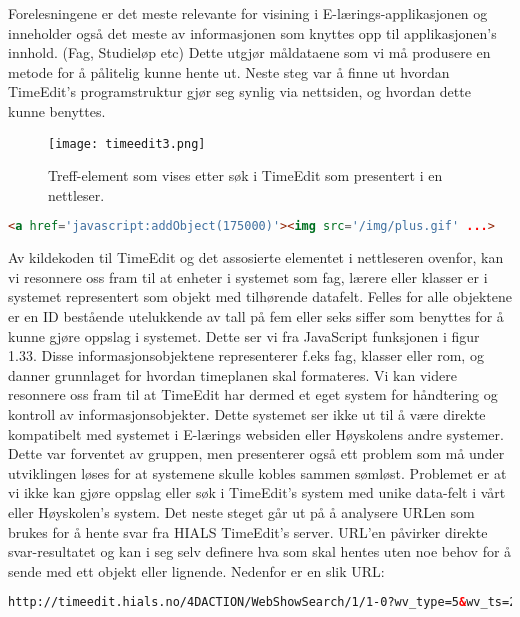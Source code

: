 \documentclass[../main.tex]{subfiles}
\begin{document}
Forelesningene er det meste relevante for visining i E-lærings-applikasjonen og inneholder også det meste av informasjonen som knyttes opp til applikasjonen’s innhold. (Fag, Studieløp etc)
Dette utgjør måldataene som vi må produsere en metode for å pålitelig kunne hente ut.\newline
\newline
Neste steg var å finne ut hvordan TimeEdit’s programstruktur gjør seg synlig via nettsiden, og hvordan dette kunne benyttes.

\begin{figure}[H]
  \centering
  \texttt{[image: timeedit3.png]}
\caption{Treff-element som vises etter søk i TimeEdit som presentert i en nettleser.}
\end{figure}

\begin{lstlisting}[language=HTML, frame=single, caption={Utdrag av kildekoden til TimeEdit's nettside som vist i figur 1.32}]
<a href='javascript:addObject(175000)'><img src='/img/plus.gif' ...>
\end{lstlisting}

Av kildekoden til TimeEdit og det assosierte elementet i nettleseren ovenfor, kan vi resonnere oss fram til at enheter i systemet som fag, lærere eller klasser er i systemet representert som objekt med tilhørende datafelt. Felles for alle objektene er en ID bestående utelukkende av tall på fem eller seks siffer som benyttes for å kunne gjøre oppslag i systemet. Dette ser vi fra JavaScript funksjonen i figur 1.33. Disse informasjonsobjektene representerer f.eks fag, klasser eller rom, og danner grunnlaget for hvordan timeplanen skal formateres. Vi kan videre resonnere oss fram til at TimeEdit har dermed et eget system for håndtering og kontroll av informasjonsobjekter. Dette systemet ser ikke ut til å være direkte kompatibelt med systemet i E-lærings websiden eller Høyskolens andre systemer. Dette var forventet av gruppen, men presenterer også ett problem som må under utviklingen løses for at systemene skulle kobles sammen sømløst. Problemet er at vi ikke kan gjøre oppslag eller søk i TimeEdit's system med unike data-felt i vårt eller Høyskolen's system. \newline
Det neste steget går ut på å analysere URLen som brukes for å hente svar fra HIALS TimeEdit's server. URL'en påvirker direkte svar-resultatet og kan i seg selv definere hva som skal hentes uten noe behov for å sende med ett objekt eller lignende. Nedenfor er en slik URL:

\begin{lstlisting}[language=HTML, frame=single, caption={En URL generert når man søker etter en timeplan for ett spesifikt fag}]
http://timeedit.hials.no/4DACTION/WebShowSearch/1/1-0?wv_type=5&wv_ts=20130511T191704X3729&wv_search=&wv_startWeek=1301&wv_stopWeek=1318&wv_first=0&wv_addObj=&wv_delObj=&wv_obj1=174000&wv_text=Tekstformat
\end{lstlisting}
\end{document}
